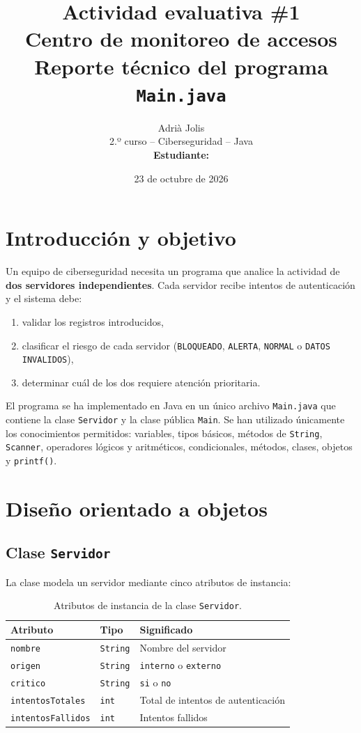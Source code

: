 \documentclass[11pt,a4paper]{article}
\title{\textbf{Actividad evaluativa \#1}\\[4pt]
\large Centro de monitoreo de accesos\\[4pt]
\large Reporte técnico del programa \texttt{Main.java}}
\author{Adrià Jolis \\ 2.º curso -- Ciberseguridad -- Java\\[6pt]
\textbf{Estudiante:} \underline{\hspace{6cm}}}
\date{23 de octubre de 2026}
\begin{document}
\maketitle
\tableofcontents
\newpage


\section{Introducción y objetivo}
Un equipo de ciberseguridad necesita un programa que analice la actividad de
\textbf{dos servidores independientes}. Cada servidor recibe intentos de
autenticación y el sistema debe:
\begin{enumerate}[nosep]
  \item validar los registros introducidos,
  \item clasificar el riesgo de cada servidor (\texttt{BLOQUEADO}, \texttt{ALERTA}, \texttt{NORMAL} o \texttt{DATOS INVALIDOS}),
  \item determinar cuál de los dos requiere atención prioritaria.
\end{enumerate}

El programa se ha implementado en Java en un único archivo \texttt{Main.java}
que contiene la clase \texttt{Servidor} y la clase pública \texttt{Main}. Se han
utilizado únicamente los conocimientos permitidos: variables, tipos básicos,
métodos de \texttt{String}, \texttt{Scanner}, operadores lógicos y aritméticos,
condicionales, métodos, clases, objetos y \texttt{printf()}.


\section{Diseño orientado a objetos}

\subsection{Clase \texttt{Servidor}}
La clase modela un servidor mediante cinco atributos de instancia:

\begin{table}[h!]
\centering
\begin{tabular}{@{}lll@{}}
\toprule
\textbf{Atributo} & \textbf{Tipo} & \textbf{Significado} \\
\midrule
\texttt{nombre}           & \texttt{String} & Nombre del servidor \\
\texttt{origen}           & \texttt{String} & \texttt{interno} o \texttt{externo} \\
\texttt{critico}          & \texttt{String} & \texttt{si} o \texttt{no} \\
\texttt{intentosTotales}  & \texttt{int}    & Total de intentos de autenticación \\
\texttt{intentosFallidos} & \texttt{int}    & Intentos fallidos \\
\bottomrule
\end{tabular}
\caption{Atributos de instancia de la clase \texttt{Servidor}.}
\end{table}
\end{document}

